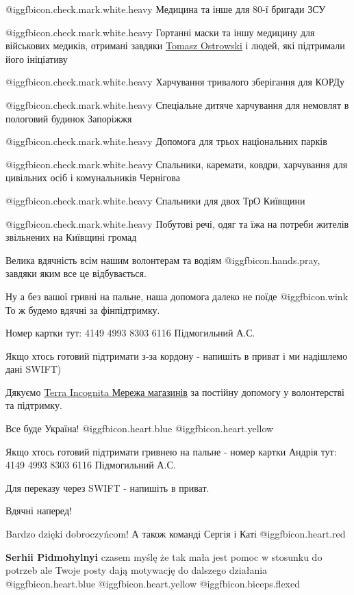 @igg{fbicon.check.mark.white.heavy}  Медицина та інше для 80-ї бригади ЗСУ

@igg{fbicon.check.mark.white.heavy}  Гортанні маски та іншу медицину для
військових медиків, отримані завдяки
\href{https://www.facebook.com/tomasz.ostrowski.714}{Tomasz Ostrowski}  і
людей, які підтримали його ініціативу 

@igg{fbicon.check.mark.white.heavy}  Харчування тривалого зберігання для КОРДу

@igg{fbicon.check.mark.white.heavy}  Спеціальне дитяче харчування для немовлят
в пологовий будинок Запоріжжя


@igg{fbicon.check.mark.white.heavy}  Допомога для трьох національних парків

@igg{fbicon.check.mark.white.heavy}  Спальники, каремати, ковдри, харчування
для цивільних осіб і комунальників Чернігова

@igg{fbicon.check.mark.white.heavy}  Спальники для двох ТрО Київщини 

@igg{fbicon.check.mark.white.heavy}  Побутові речі, одяг та їжа на потреби
жителів звільнених на Київщині громад

Велика вдячність всім нашим волонтерам та водіям @igg{fbicon.hands.pray}, завдяки яким все це
відбувається.


Ну а без вашої гривні на пальне, наша допомога далеко не поїде @igg{fbicon.wink}  То ж будемо
вдячні за фінпідтримку. 

Номер картки тут: 4149 4993 8303 6116 Підмогильний А.С. 

Якщо хтось готовий підтримати з-за кордону - напишіть в приват і ми надішлемо
дані SWIFT) 

Дякуємо \href{https://www.facebook.com/TerraIncognitaUA}{Terra Incognita Мережа магазинів} за постійну допомогу у волонтерстві та
підтримку.

Все буде Україна! @igg{fbicon.heart.blue}  @igg{fbicon.heart.yellow} 


\begin{itemize} %

Якщо хтось готовий підтримати гривнею на пальне - номер картки Андрія тут: 4149
4993 8303 6116 Підмогильний А.С.

Для переказу через SWIFT - напишіть в приват.

Вдячні наперед!

Bardzo dzięki dobroczyńcom! А також команді Сергія і Каті @igg{fbicon.heart.red}

\textbf{Serhii Pidmohylnyi} czasem myślę że tak mała jest pomoc w stosunku do potrzeb ale Twoje posty dają motywację do dalszego działania  @igg{fbicon.heart.blue}  @igg{fbicon.heart.yellow}   @igg{fbicon.biceps.flexed} 
\end{itemize} %
